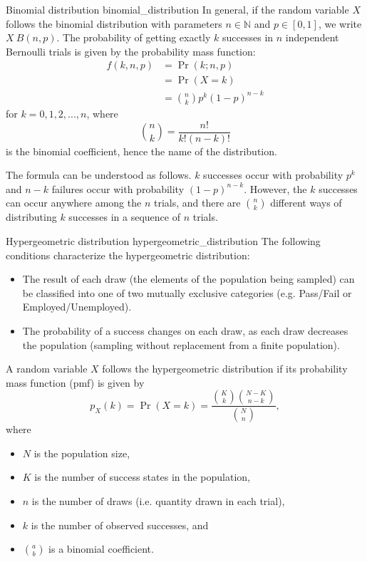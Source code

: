 \begin{definition}{Binomial distribution \cite{wikipedia_binomial_distribution}}{binomial_distribution}
	In general, if the random variable $X$ follows the binomial distribution with parameters $n \in \mathbb{N}$ and $p \in [0, 1]$, we write $X ~ B(n, p)$. The probability of getting exactly $k$ successes in $n$ independent Bernoulli trials is given by the probability mass function:
	\begin{align*}
		f(k,n,p) &= \Pr(k; n, p) \\
		&= \Pr(X = k) \\
		&= {\binom{n}{k}} p^{k} (1 - p)^{n - k}
	\end{align*}
	for $k = 0, 1, 2, ..., n$, where
	$$ {\binom{n}{k}} = \frac {n!}{k!(n-k)!} $$
	is the binomial coefficient, hence the name of the distribution. 
\end{definition}

The formula can be understood as follows. $k$ successes occur with probability $p^k$ and $n - k$ failures occur with probability $(1 - p)^{n - k}$. However, the $k$ successes can occur anywhere among the $n$ trials, and there are $\binom{n}{k}$ different ways of distributing $k$ successes in a sequence of $n$ trials. \cite{wikipedia_binomial_distribution}

\begin{definition}{Hypergeometric distribution \cite{wikipedia_hypergeometric_distribution}}{hypergeometric_distribution}
	The following conditions characterize the hypergeometric distribution:

	\begin{itemize}
		\item The result of each draw (the elements of the population being sampled) can be classified into one of two mutually exclusive categories (e.g. Pass/Fail or Employed/Unemployed).
		\item The probability of a success changes on each draw, as each draw decreases the population (sampling without replacement from a finite population).
	\end{itemize}	
	
	A random variable $X$ follows the hypergeometric distribution if its probability mass function (pmf) is given by
	$$ 
		p_X(k) = \Pr(X = k) = \frac{\binom{K}{k} \binom{N-K}{n-k}}{\binom{N}{n}},
	$$
	where
	\begin{itemize}
		\item $N$ is the population size,
		\item $K$ is the number of success states in the population,
		\item $n$ is the number of draws (i.e. quantity drawn in each trial),
		\item $k$ is the number of observed successes, and
		\item $a \choose b$ is a binomial coefficient.
	\end{itemize}
\end{definition}


